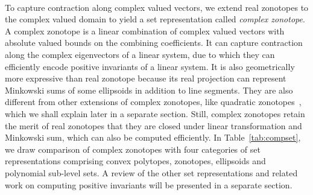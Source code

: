 \begin{table}
\caption{Comparison of set representations}~\label{tab:compset}
\end{table}


To capture contraction along complex valued vectors, we extend real
zonotopes to the complex valued domain to yield a set representation
called {\it complex zonotope}.  A complex zonotope is a linear
combination of complex valued vectors with absolute valued bounds on
the combining coefficients.  It can capture contraction along the
complex eigenvectors of a linear system, due to which they can
efficiently encode positive invariants of a linear system.  It is also
geometrically more expressive than real zonotope because its real
projection can represent Minkowski sums of some ellipsoids in addition
to line segments.  They are also different from other extensions of
complex zonotopes, like quadratic
zonotopes~\cite{DBLP:conf/aplas/AdjeGW15}, which we shall explain
later in a separate section.  Still, complex zonotopes retain the
merit of real zonotopes that they are closed under linear
transformation and Minkowski sum, which can also be computed
efficiently.  In Table~\ref{tab:compset}, we draw comparison of
complex zonotopes with four categories of set representations
comprising convex polytopes, zonotopes, ellipsoids and polynomial
sub-level sets.  A review of the other set representations and related
work on computing positive invariants will be presented in a separate
section.


